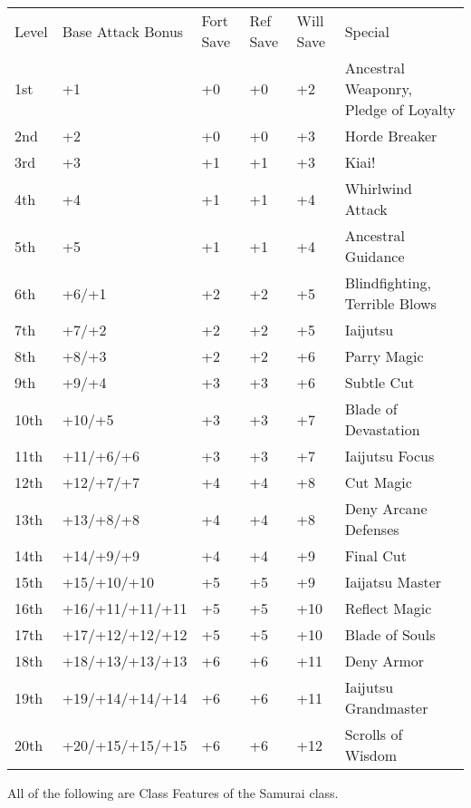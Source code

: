\begin{table}[tbh]
\begin{small}
\begin{tabular}{lp{3cm}p{0.7cm}p{0.7cm}p{0.7cm}l}
Level  &Base Attack Bonus &Fort Save &Ref Save &Will Save &Special\\
1st &+1 &+0 &+0 &+2 &Ancestral Weaponry, Pledge of Loyalty\\
2nd &+2 &+0 &+0 &+3 &Horde Breaker\\
3rd &+3 &+1 &+1 &+3 &Kiai!\\
4th &+4 &+1 &+1 &+4 &Whirlwind Attack\\
5th &+5 &+1 &+1 &+4 &Ancestral Guidance\\
6th &+6/+1 &+2 &+2 &+5 &Blindfighting, Terrible Blows\\
7th &+7/+2 &+2 &+2 &+5 &Iaijutsu\\
8th &+8/+3 &+2 &+2 &+6 &Parry Magic\\
9th &+9/+4 &+3 &+3 &+6 &Subtle Cut\\
10th &+10/+5 &+3 &+3 &+7 &Blade of Devastation\\
11th &+11/+6/+6 &+3 &+3 &+7 &Iaijutsu Focus\\
12th &+12/+7/+7 &+4 &+4 &+8 &Cut Magic\\
13th &+13/+8/+8 &+4 &+4 &+8 &Deny Arcane Defenses\\
14th &+14/+9/+9 &+4 &+4 &+9 &Final Cut\\
15th &+15/+10/+10 &+5 &+5 &+9 &Iaijatsu Master\\
16th &+16/+11/+11/+11 &+5 &+5 &+10 &Reflect Magic\\
17th &+17/+12/+12/+12 &+5 &+5 &+10 &Blade of Souls\\
18th &+18/+13/+13/+13 &+6 &+6 &+11 &Deny Armor\\
19th &+19/+14/+14/+14 &+6 &+6 &+11 &Iaijutsu Grandmaster\\
20th &+20/+15/+15/+15 &+6 &+6 &+12 &Scrolls of Wisdom\\
\end{tabular}
\end{small}
\end{table}

\smallskip\noindent All of the following are Class Features of the Samurai class.


